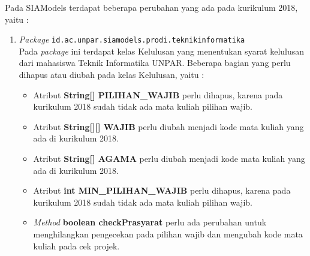 Pada SIAModels terdapat beberapa perubahan yang ada pada kurikulum 2018, yaitu :
\begin{enumerate}
	\item \textit{Package} \texttt{id.ac.unpar.siamodels.prodi.teknikinformatika}\\
	Pada \textit{package} ini terdapat kelas Kelulusan yang menentukan syarat kelulusan dari mahasiswa Teknik Informatika UNPAR. Beberapa bagian yang perlu dihapus atau diubah pada kelas Kelulusan, yaitu :
	\begin{itemize}
		\item Atribut \textbf{String[] PILIHAN\_WAJIB} perlu dihapus, karena pada kurikulum 2018 sudah tidak ada mata kuliah pilihan wajib.
		\item Atribut \textbf{String[][] WAJIB} perlu diubah menjadi kode mata kuliah yang ada di kurikulum 2018.
		\item Atribut \textbf{String[] AGAMA} perlu diubah menjadi kode mata kuliah yang ada di kurikulum 2018.
		\item Atribut \textbf{int MIN\_PILIHAN\_WAJIB} perlu dihapus, karena pada kurikulum 2018 sudah tidak ada mata kuliah pilihan wajib.
		\item \textit{Method} \textbf{boolean checkPrasyarat} perlu ada perubahan untuk menghilangkan pengecekan pada pilihan wajib dan mengubah kode mata kuliah pada cek projek.
	\end{itemize}
		

\end{enumerate}
